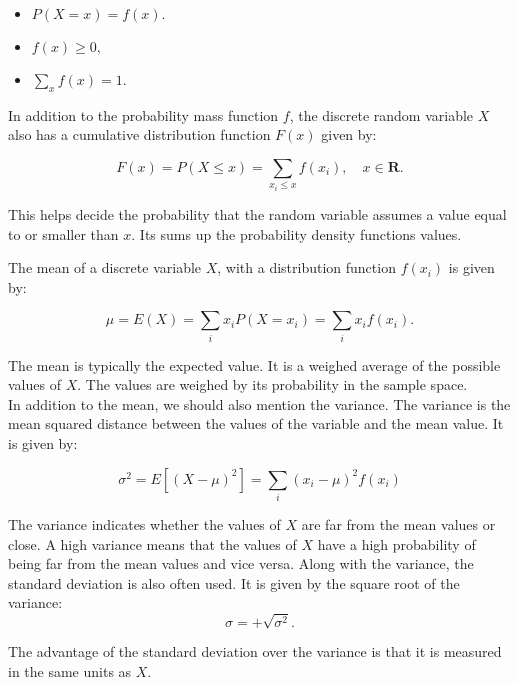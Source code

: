 \begin{itemize}
	\item $P(X = x) = f(x).$
	\item $f(x) \geq 0,$
	\item $\sum_x f(x) = 1.$
\end{itemize}

\noindent In addition to the probability mass function $f$, the discrete random variable $X$ also has a cumulative distribution function $F(x)$ given by:

\begin{equation}
F(x) = P(X \leq x) = \sum_{x_i \leq x} f(x_i), \quad x \in \textbf{R}.
\end{equation}


\noindent This helps decide the probability that the random variable assumes a value equal to or smaller than $x$. Its sums up the probability density functions values.
\newline

\noindent The mean of a discrete variable $X$, with a distribution function $f(x_{i})$ is given by:

\begin{equation}
\mu = E(X) = \sum_i x_i P(X = x_i) = \sum_i x_i f(x_i).
\end{equation}

\noindent The mean is typically the expected value. It is a weighed average of the possible values of $X$. The values are weighed by its probability in the sample space.
\\

\noindent In addition to the mean, we should also mention the variance. The variance is the mean squared distance between the values of the variable and the mean value. It is given by:

\begin{equation}
\sigma^2 = E\left[(X - \mu)^2\right] = \sum_{i} (x_i - \mu)^2 f(x_i)
\end{equation}

\noindent The variance indicates whether the values of $X$ are far from the mean values or close. A high variance means that the values of $X$ have a high probability of being far from the mean values and vice versa. Along with the variance, the standard deviation is also often used. It is given by the square root of the variance:
\begin{equation}
\sigma=+\sqrt{\sigma^2}.
\end{equation}

\noindent The advantage of the standard deviation over the variance is that it is measured in the same units as $X$.


